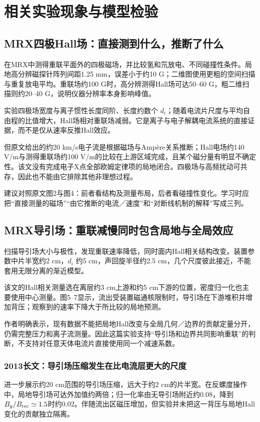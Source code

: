 \chapter{相关实验现象与模型检验}
\section{MRX四极Hall场：直接测到什么，推断了什么}
\citet{Ren2005}在MRX中测得重联平面外的四极磁场，并比较氢和氘放电、不同碰撞性条件。局地高分辨磁探针阵列间距1.25 mm，误差小于约10 G；二维图使用更粗的空间扫描与重复放电平均。重联场约100 G时，高分辨测得Hall场可达50--60 G，粗二维扫描则约20--40 G，说明仪器分辨率本身影响峰值。

实验四极场宽度与离子惯性长度同阶、长度约数个 $d_i$；随着电流片尺度与平均自由程的比值增大，Hall场相对重联场减弱。它是离子与电子解耦电流系统的直接证据，而不是仅从速率反推Hall效应。

但原文给出的约20 km/s电子流是根据磁场与Ampère关系推断；Hall电场约140 V/m与测得重联场约100 V/m的比较在上游区域完成，且某个磁分量有明显不确定性。该文没有完成电子X点全部欧姆定律项的局地闭合。四极场与高频扰动可共存，因此也不能由它排除其他非理想过程。

建议对照原文图2与图4：前者看结构及测量布局，后者看碰撞性变化。学习时应把“直接测量的磁场”“由它推断的电流／速度”和“对断线机制的解释”写成三列。

\section{MRX导引场：重联减慢同时包含局地与全局效应}
\citet{GuideExp2012}扫描导引场大小与极性，发现重联速率降低，同时面内Hall相关结构改变。装置参数中片半宽约2 cm，$d_i$ 约5 cm，声回旋半径约2.5 cm，几个尺度彼此接近，不能套用无限分离的渐近模型。

该文的Hall相关测量选在离层约3 cm上游和约5 cm下游的位置，密度归一化也主要使用中心测量。图5--7显示，流出受装置磁通核限制时，导引场在下游堆积并增加背压；观察到的速率下降大于所比较的局地预测。

作者明确表示，现有数据不能把局地Hall改变与全局几何／边界的贡献定量分开，仍需完整压力和离子流测量。因此这篇实验支持“导引场和边界共同影响重联”的判断，不支持对任意天体电流片直接使用同一个减速系数。

\subsection{2013长文：导引场压缩发生在比电流层更大的尺度}
\citet{L193}进一步展示约20 cm范围的导引场压缩，远大于约2 cm的片半宽。在反螺度操作中，局地导引场可达外加值约两倍；归一化率由无导引场附近约0.08，降到$B_g/B_{\rm rec}\simeq1.5$时约0.02。伴随流出区磁压增加，但实验并未把这一背压与局地Hall变化的贡献独立隔离。

